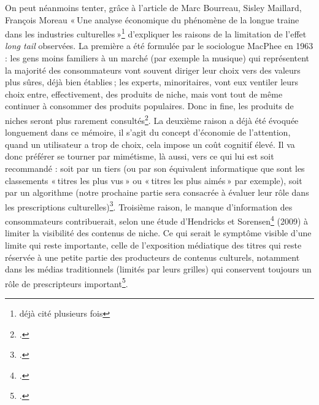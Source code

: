 On peut néanmoins tenter, grâce à l’article de Marc Bourreau, Sisley Maillard, François Moreau « Une analyse économique du phénomène de la longue traine dans les industries culturelles »\footnote{déjà cité plusieurs fois} d’expliquer les raisons de la limitation de l’effet \textit{long tail} observées. La première a été formulée par le sociologue MacPhee en 1963 : les gens moins familiers à un marché (par exemple la musique) qui représentent la majorité des consommateurs vont souvent diriger leur choix vers des valeurs plus sûres, déjà bien établies ; les experts, minoritaires, vont eux ventiler leurs choix entre, effectivement, des produits de niche, mais vont tout de même continuer à consommer des produits populaires. Donc in fine, les produits de niches seront plus rarement consultés\footcite[§ 29]{bourreau2015a}. La deuxième raison a déjà été évoquée longuement dans ce mémoire, il s’agit du concept d’économie de l’attention, quand un utilisateur a trop de choix, cela impose un coût cognitif élevé. Il va donc préférer se tourner par mimétisme, là aussi, vers ce qui lui est soit recommandé : soit par un tiers (ou par son équivalent informatique que sont les classements « titres les plus vus » ou « titres les plus aimés » par exemple), soit par un algorithme (notre prochaine partie sera consacrée à évaluer leur rôle dans les prescriptions culturelles)\footcite[§ 39]{bourreau2015a}. Troisième raison, le manque d’information des consommateurs contribuerait, selon une étude d’Hendricks et Sorensen\footcite[§ 40]{bourreau2015a} (2009) à limiter la visibilité des contenus de niche. Ce qui serait le symptôme visible d’une limite qui reste importante, celle de l’exposition médiatique des titres qui reste réservée à une petite partie des producteurs de contenus culturels, notamment dans les médias traditionnels (limités par leurs grilles) qui conservent toujours un rôle de prescripteurs important\footcite[§ 41]{bourreau2015a}.

